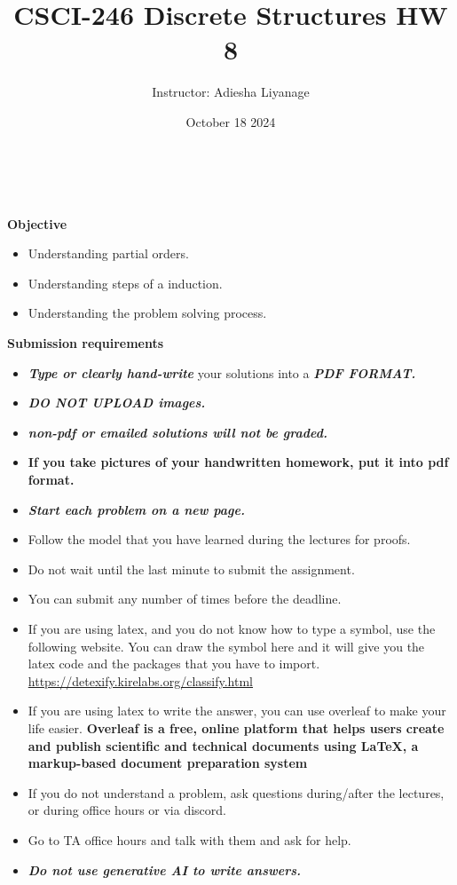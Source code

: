 \documentclass[12pt]{exam}
\title{CSCI-246 Discrete Structures HW 8}
\author{Instructor: Adiesha Liyanage}
\date{October 18 2024}
\begin{document}
\maketitle

\hrulefill
\\
\\
\textbf{Objective}
\begin{itemize}
    \item Understanding partial orders.
    \item Understanding steps of a induction.
    \item Understanding the problem solving process.
\end{itemize}

\textbf{Submission requirements}
\begin{itemize}
    \item \textbf{\textit{Type or clearly hand-write}} your solutions into a \textbf{\textit{PDF FORMAT.}} 
    \item \textbf{\textit{DO NOT UPLOAD images.}}
    \item \textbf{\textit{non-pdf or emailed solutions will not be graded.}}
    \item \textbf{If you take pictures of your handwritten homework, put it into pdf format.}
    \item \textbf{\textit{Start each problem on a new page.}}
    \item Follow the model that you have learned during the lectures for proofs.
    \item Do not wait until the last minute to submit the assignment.
    \item You can submit any number of times before the deadline. 
    \item If you are using latex, and you do not know how to type a symbol, use the following website. You can draw the symbol here and it will give you the latex code and the packages that you have to import. \url{https://detexify.kirelabs.org/classify.html}
    \item If you are using latex to write the answer, you can use overleaf to make your life easier. \textbf{Overleaf is a free, online platform that helps users create and publish scientific and technical documents using LaTeX, a markup-based document preparation system}
    \item If you do not understand a problem, ask questions during/after the lectures, or during office hours or via discord.
    \item Go to TA office hours and talk with them and ask for help.
    \item \textbf{\textit{Do not use generative AI to write answers.}} 
\end{itemize}
\end{document}
